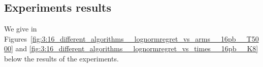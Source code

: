 

\subsection{Experiments results}

We give in Figures~\ref{fig:3:16_different_algorithms__lognormregret_vs_arms__16pb__T5000} and \ref{fig:3:16_different_algorithms__lognormregret_vs_times__16pb__K8} below the results of the experiments.







